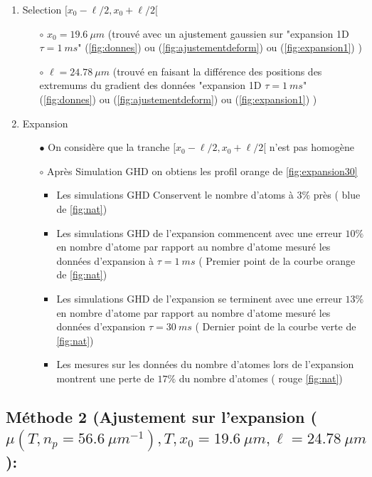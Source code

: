 \documentclass[a3, 10pt,twoside]{article}          %
\theoremstyle{plain}
\theoremstyle{definition}
\theoremstyle{remark}
\theoremstyle{definition} %
\def\OliveGreen{OliveGreen}
\begin{document}
\begin{enumerate}[label =\Alph*)]
				\item Selection $[ x_0 - \ell/2 , x_0 + \ell/2[$ 
					\begin{itemize}
								\item[$\circ$] $x_0 = 19.6 ~\mu m $ (trouvé avec un ajustement gaussien sur {\color{OliveGreen}"expansion 1D $\tau =1~ms$" (\ref{fig:donnes})} ou {\color{orange} (\ref{fig:ajustementdeform}) } ou {\color{blue}(\ref{fig:expansion1})} ) 
								\item[$\circ$] $\ell = 24.78 ~ \mu m $ (trouvé en faisant la différence des positions des extremums du gradient des données {\color{OliveGreen}"expansion 1D $\tau =1~ms$" (\ref{fig:donnes})} ou {\color{orange} (\ref{fig:ajustementdeform}) } ou {\color{blue}(\ref{fig:expansion1})} )
							\end{itemize}
				\item Expansion 
					\begin{itemize}
								\item[$\bullet$]	 On considère que la tranche $[ x_0 - \ell/2 , x_0 + \ell/2[$ n'est pas homogène 
								\item[$\circ$] Après Simulation GHD on obtiens les profil {\color{orange} orange de \ref{fig:expansion30}}  
									\begin{itemize}
										\item Les simulations GHD Conservent le nombre d'atoms à $3\%$ près ({\color{blue} blue de \ref{fig:nat}})
										\item Les simulations GHD de l'expansion commencent avec une erreur $10\%$ en nombre d'atome par rapport au nombre d'atome mesuré les données d'expansion à $\tau = 1~ms$ ({\color{orange} Premier point de la courbe orange de \ref{fig:nat}}) 
										\item Les simulations GHD de l'expansion se terminent avec une erreur $13\%$ en nombre d'atome par rapport au nombre d'atome mesuré les données d'expansion $\tau = 30~ms$ ({\color{\OliveGreen} Dernier point de la courbe verte de \ref{fig:nat}})
										\item Les mesures sur les données du nombre d'atomes lors de l'expansion montrent une perte de $17\%$ du nombre d'atomes ({\color{red} rouge \ref{fig:nat}})
									\end{itemize}	 	
							\end{itemize}

			\end{enumerate}
			
	\subsection{Méthode 2 (Ajustement sur l'expansion ($\mu( T , n_p = 56.6 ~{\mu m}^{-1} ) , T , x_0 = 19.6 ~\mu m  , \ell = 24.78 ~ \mu m  $ ): } 
	
\end{document}

